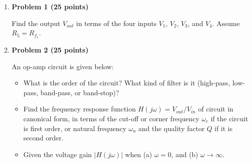 \begin{enumerate}


\item {\bf Problem 1 (25 points)} 

  Find the output $V_{out}$ in terms of the four inputs $V_1$,
  $V_2$, $V_3$, and $V_4$. Assume $R_5=R_{f_1}$.


  \begin{comment}

  {\bf Solution:} Let $V$ be the output of the first op-amp.
  \[
  \frac{V_1}{R_1}+\frac{V_2}{R_2}+\frac{V}{R_{f_1}}=0,
  \;\;\;\;\;\;\mbox{i.e.,}\;\;\;\;
  V=-\frac{R_{f_1}}{R_1}V_1-\frac{R_{f_1}}{R_2}V_2
  \]
  \[
  \frac{V_{out}}{R_{f_2}}+\frac{V_3}{R_3}+\frac{V_4}{R_4}+\frac{V}{R_5}
  =\frac{V_{out}}{R_{f_2}}+\frac{V_3}{R_3}+\frac{V_4}{R_4}
  -\frac{1}{R_5}\left(\frac{R_{f_1}}{R_1}V_1-\frac{R_{f_1}}{R_2}V_2\right)=0
  \]
  Solving for $V_{out}$:
  \[
  V_{out}=\frac{R_{f_2}}{R_5}\frac{R_{f_1}}{R_1}V_1+\frac{R_{f_2}}{R_5}\frac{R_{f_1}}{R_2}V_2-\frac{R_{f_2}}{R_3}V_3-\frac{R_{f_2}}{R_4}V_4
  =\frac{R_{f_2}}{R_1}V_1+\frac{R_{f_2}}{R_2}V_2-\frac{R_{f_2}}{R_3}V_3-\frac{R_{f_2}}{R_4}V_4
  \]
  \end{comment}

\item {\bf Problem 2 (25 points)} 

  An op-amp circuit is given below:


  \begin{itemize}
  \item What is the order of the circuit? What kind of filter is it
    (high-pass, low-pass, band-pass, or band-stop)? 
  \item Find the frequency response function $H(j\omega)=V_{out}/V_{in}$ 
    of circuit in canonical form, in terms of the cut-off or corner 
    frequency $\omega_c$ if the circuit is first order, or natural 
    frequency $\omega_n$ and the quality factor $Q$ if it is second
    order.
  \item Given the voltage gain $|H(j\omega)|$ when (a) $\omega=0$, 
    and (b) $\omega\rightarrow\infty$.
  \end{itemize}

  \begin{comment}
    {\bf Solution:}


\end{comment}
\end{enumerate}
